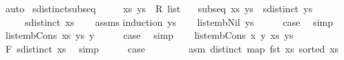 \begin{isabellebody}
\ auto\isanewline
{}\isamarkupfalse%
%
\endisatagproof
{\isafoldproof}%
%
\isadelimproof
\isanewline
%
\endisadelimproof
\isanewline
{}\isamarkupfalse%
\ sdistinct{\isacharunderscore}{\kern0pt}subseq{\isacharcolon}{\kern0pt}\isanewline
\ \ \ \ \ xs\ ys\ {\isacharcolon}{\kern0pt}{\isacharcolon}{\kern0pt}\ {\isachardoublequoteopen}R{}\ list{\isachardoublequoteclose}\isanewline
\ \ \ {\isachardoublequoteopen}subseq\ xs\ ys{\isachardoublequoteclose}\ \ {\isachardoublequoteopen}sdistinct\ ys{\isachardoublequoteclose}\isanewline
\ \ \ \ \ {\isachardoublequoteopen}sdistinct\ xs{\isachardoublequoteclose}\isanewline
%
\isadelimproof
\ \ %
\endisadelimproof
%
\isatagproof
{}\isamarkupfalse%
\ assms\isanewline
{}\isamarkupfalse%
{\isacharparenleft}{\kern0pt}induction\ ys{\isacharparenright}{\kern0pt}\isanewline
\ \ \isamarkupfalse%
\ {\isacharparenleft}{\kern0pt}list{\isacharunderscore}{\kern0pt}emb{\isacharunderscore}{\kern0pt}Nil\ ys{\isacharparenright}{\kern0pt}\isanewline
\ \ \isamarkupfalse%
\ \isamarkupfalse%
\ {\isacharquery}{\kern0pt}case\ \isamarkupfalse%
\ simp\isanewline
{}\isamarkupfalse%
\isanewline
\ \ \isamarkupfalse%
\ {\isacharparenleft}{\kern0pt}list{\isacharunderscore}{\kern0pt}emb{\isacharunderscore}{\kern0pt}Cons\ xs\ ys\ y{\isacharparenright}{\kern0pt}\isanewline
\ \ \isamarkupfalse%
\ \isamarkupfalse%
\ {\isacharquery}{\kern0pt}case\ \isamarkupfalse%
\ simp\isanewline
{}\isamarkupfalse%
\isanewline
\ \ \isamarkupfalse%
\ {\isacharparenleft}{\kern0pt}list{\isacharunderscore}{\kern0pt}emb{\isacharunderscore}{\kern0pt}Cons{}\ x\ y\ xs\ ys{\isacharparenright}{\kern0pt}\isanewline
\ \ \isamarkupfalse%
\ F{}{\isacharcolon}{\kern0pt}\ {\isachardoublequoteopen}sdistinct\ xs{\isachardoublequoteclose}\ \isamarkupfalse%
\ simp\isanewline
\ \ \isamarkupfalse%
\ \isamarkupfalse%
\ {\isacharquery}{\kern0pt}case\isanewline
\ \ \isamarkupfalse%
\isanewline
\ \ \ \ \isamarkupfalse%
\ asm{\isacharcolon}{\kern0pt}\ {\isachardoublequoteopen}distinct\ {\isacharparenleft}{\kern0pt}map\ fst\ xs{\isacharparenright}{\kern0pt}{\isachardoublequoteclose}\ {\isachardoublequoteopen}sorted\ xs{\isachardoublequoteclose}\isanewline

\end{isabellebody}
